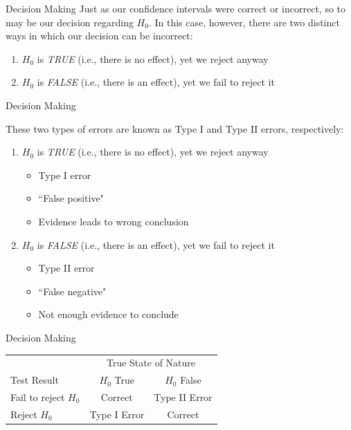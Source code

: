 \documentclass{beamer}
\begin{document}
\begin{frame}{Decision Making}
Just as our confidence intervals were correct or incorrect, so to may be our decision regarding $H_0$. In this case, however, there are two distinct ways in which our decision can be incorrect:

\vspace{2mm}

\begin{enumerate}
\item $H_0$ is \textit{TRUE} (i.e., there is no effect), yet we reject anyway \vspace{3mm}
\item $H_0$ is \textit{FALSE} (i.e., there is an effect), yet we fail to reject it
\end{enumerate} 

\end{frame}


\begin{frame}{Decision Making}

These two types of errors are known as Type I and Type II errors, respectively: \vspace{4mm}

\begin{enumerate}
\item $H_0$ is \textit{TRUE} (i.e., there is no effect), yet we reject anyway
	\begin{itemize}
	\item Type I error
	\item ``False positive"
	\item Evidence leads to wrong conclusion
	\end{itemize} \vspace{4mm}
\item $H_0$ is \textit{FALSE} (i.e., there is an effect), yet we fail to reject it
	\begin{itemize}
	\item Type II error
	\item ``False negative"
	\item Not enough evidence to conclude
	\end{itemize}
\end{enumerate} 

\end{frame}

\begin{frame}{Decision Making}

\begin{center}
\def\arraystretch{1.25}
\begin{tabular}{|l|c|c|}
	\hline
	& \multicolumn{2}{c|}{True State of Nature} \\ 
    \cline{2-3} 
    Test Result  & $H_0$ True  & $H_0$ False \\ 
    \hline
    Fail to reject $H_0$ & Correct & Type II Error \\ \hline
    Reject $H_0$ & Type I Error & Correct \\ \hline

\end{tabular}
\end{center}

\end{frame}
\end{document}
